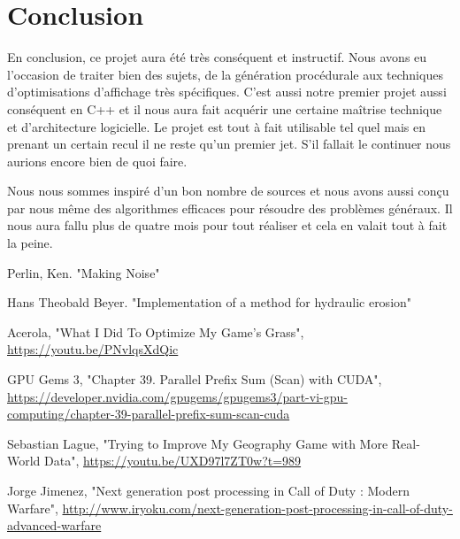 \documentclass{EPUProjetDi}
\begin{document}
\chapter*{Conclusion}

En conclusion, ce projet aura été très conséquent et instructif. Nous avons eu l'occasion de traiter bien des sujets, de la génération procédurale aux techniques d'optimisations d'affichage  très spécifiques. C'est aussi notre premier projet aussi conséquent en C++ et il nous aura fait acquérir une certaine maîtrise technique et d'architecture logicielle. Le projet est tout à fait utilisable tel quel mais en prenant un certain recul il ne reste qu'un premier jet. S'il fallait le continuer nous aurions encore bien de quoi faire.

Nous nous sommes inspiré d'un bon nombre de sources et nous avons aussi conçu par nous même des algorithmes efficaces pour résoudre des problèmes généraux. Il nous aura fallu plus de quatre mois pour tout réaliser et cela en valait tout à fait la peine.




\begin{thebibliography}{9}
Perlin, Ken. "Making Noise"

Hans Theobald Beyer. "Implementation of a method for hydraulic erosion"

Acerola, "What I Did To Optimize My Game's Grass", \url{https://youtu.be/PNvlqsXdQic}

GPU Gems 3, "Chapter 39. Parallel Prefix Sum (Scan) with CUDA", \url{https://developer.nvidia.com/gpugems/gpugems3/part-vi-gpu-computing/chapter-39-parallel-prefix-sum-scan-cuda}

Sebastian Lague, "Trying to Improve My Geography Game with More Real-World Data", \url{https://youtu.be/UXD97l7ZT0w?t=989}


Jorge Jimenez, "Next generation post processing in Call of Duty : Modern Warfare", \url{http://www.iryoku.com/next-generation-post-processing-in-call-of-duty-advanced-warfare}



\end{thebibliography}


\end{document}
